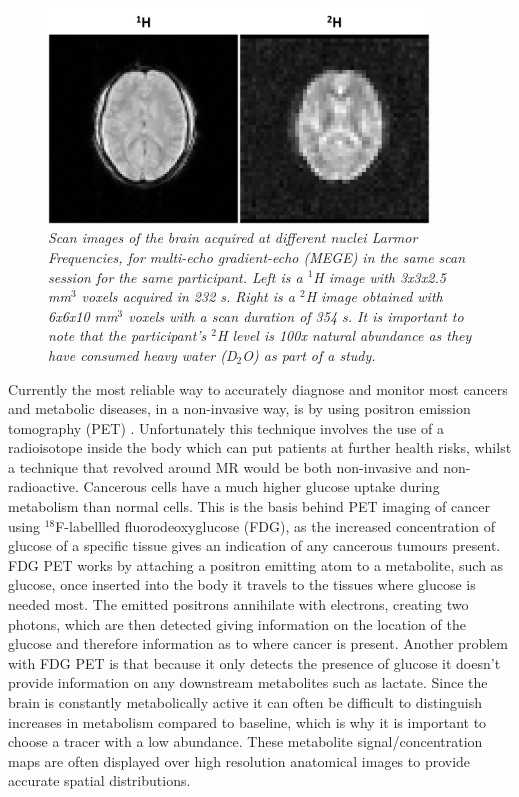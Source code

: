 \documentclass[class=article, crop=false]{standalone}
\begin{document}
\begin{figure}[ht]
    \centering
    \includegraphics[width=0.9\textwidth]{Figures/Intro/1H2H_Brain.png}
    \caption{\textit{Scan images of the brain acquired at different nuclei Larmor Frequencies, for multi-echo gradient-echo (MEGE) in the same scan session for the same participant. Left is a $^1$H image with 3x3x2.5 mm$^3$ voxels acquired in 232 s. Right is a $^2$H image obtained with 6x6x10 mm$^3$ voxels with a scan duration of 354 s. It is important to note that the participant's $^2$H level is 100x natural abundance as they have consumed heavy water (D$_2$O) as part of a study.}}
    \label{fig:intro:1H2H_Brain}
\end{figure}

Currently the most reliable way to accurately diagnose and monitor most cancers and metabolic diseases, in a non-invasive way, is by using positron emission tomography (PET)  \cite{Almuhaideb201118F-FDGOncology}. Unfortunately this technique involves the use of a radioisotope inside the body which can put patients at further health risks, whilst a technique that revolved around MR would be both non-invasive and non-radioactive. Cancerous cells have a much higher glucose uptake during metabolism than normal cells. This is the basis behind PET imaging of cancer using $^{18}$F-labellled fluorodeoxyglucose (FDG), as the increased concentration of glucose of a specific tissue gives an indication of any cancerous tumours present. FDG PET works by attaching a positron emitting atom to a metabolite, such as glucose, once inserted into the body it travels to the tissues where glucose is needed most. The emitted positrons annihilate with electrons, creating two photons, which are then detected giving information on the location of the glucose and therefore information as to where cancer is present. Another problem with FDG PET is that because it only detects the presence of glucose it doesn't provide information on any downstream metabolites such as lactate. Since the brain is constantly metabolically active it can often be difficult to distinguish increases in metabolism compared to baseline, which is why it is important to choose a tracer with a low abundance. These metabolite signal/concentration maps are often displayed over high resolution anatomical images to provide accurate spatial distributions.
\end{document}
